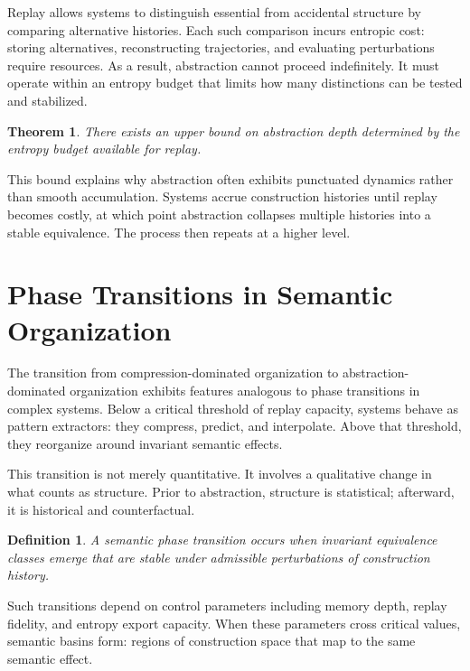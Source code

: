 \documentclass[11pt]{article}
\newtheorem{definition}{Definition}[section]
\newtheorem{theorem}{Theorem}[section]
\begin{document}
Replay allows systems to distinguish essential from accidental structure by comparing alternative histories. Each such comparison incurs entropic cost: storing alternatives, reconstructing trajectories, and evaluating perturbations require resources. As a result, abstraction cannot proceed indefinitely. It must operate within an entropy budget that limits how many distinctions can be tested and stabilized.

\begin{theorem}
There exists an upper bound on abstraction depth determined by the entropy budget available for replay.
\end{theorem}

This bound explains why abstraction often exhibits punctuated dynamics rather than smooth accumulation. Systems accrue construction histories until replay becomes costly, at which point abstraction collapses multiple histories into a stable equivalence. The process then repeats at a higher level.

\section{Phase Transitions in Semantic Organization}

The transition from compression-dominated organization to abstraction-dominated organization exhibits features analogous to phase transitions in complex systems. Below a critical threshold of replay capacity, systems behave as pattern extractors: they compress, predict, and interpolate. Above that threshold, they reorganize around invariant semantic effects.

This transition is not merely quantitative. It involves a qualitative change in what counts as structure. Prior to abstraction, structure is statistical; afterward, it is historical and counterfactual.

\begin{definition}
A semantic phase transition occurs when invariant equivalence classes emerge that are stable under admissible perturbations of construction history.
\end{definition}

Such transitions depend on control parameters including memory depth, replay fidelity, and entropy export capacity. When these parameters cross critical values, semantic basins form: regions of construction space that map to the same semantic effect.
\end{document}

